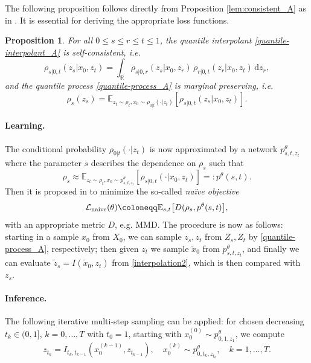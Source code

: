 \documentclass{article}
\newcommand{\R}{\mathbb{R}}
\renewcommand{\d}{\, \mathrm{d}}
\theoremstyle{plain}
\newtheorem{proposition}[theorem]{Proposition}
\theoremstyle{definition}
\theoremstyle{remark}
\begin{document}
The following proposition follows directly 
from Proposition \ref{lem:consistent_A} as in \cite{IMM2025}. It is essential for deriving the appropriate loss functions.

\begin{proposition}\label{lem:self-consistency_A}
For all $0 \le s \le r \le t\le 1$, the quantile interpolant \eqref{quantile-interpolant_A} is self-consistent, i.e.
\begin{equation}
\rho_{s|0, t}(z_s|x_0, z_t)
= \int_{\R} \rho_{s|0, r}(z_s|x_0, z_r) \, \rho_{r|0, t}(z_r|x_0, z_t) \d z_r , 
\end{equation}
and the quantile process \eqref{quantile-process_A} is marginal preserving, i.e.
    \begin{equation}\label{eq:marginal-preserv}
        \rho_{s}(z_s) 
        = 
        \mathbb E_{z_t \sim \rho_{t}, x_0 \sim \rho_{0|t}(\cdot|z_t)}
        \left[ \rho_{s|0, t}(z_s|x_0, z_t) \right].
    \end{equation}    
\end{proposition}

\paragraph{Learning.} The conditional probability  $\rho_{0|t}(\cdot|z_t)$ is now approximated by a network $p^\theta_{s,t,z_t}$ where the parameter $s$ describes the dependence on $\rho_{s}$ such that
\begin{equation}\label{target-objective}
  \rho_{s}  \approx  
        \mathbb E_{z_t \sim \rho_{t}, x_0 \sim p^\theta_{s,t,z_t}}
        \left[ \rho_{s|0, t}(\cdot|x_0, z_t) \right] =: p^\theta(s,t).
        \end{equation}  
Then it is proposed in \cite{IMM2025} to minimize the so-called \emph{na\"ive objective}
\begin{equation}\label{naive-objective}
   \mathcal{L}_{\rm naive}(\theta) \coloneqq \mathbb{E}_{s,t} \big[ D(\rho_{s}, p^\theta(s,t) \big],
\end{equation}
with an appropriate metric $D$, e.g. MMD. 
The procedure is now as follows: starting in a sample $x_0$ from $X_0$, we can sample $z_s, z_t$ from $Z_s, Z_t$ by \eqref{quantile-process_A}, respectively; then given $z_t$ we sample $\tilde x_0$ from $p^\theta_{s,t,z_t}$, and finally we can evaluate $\tilde z_s=I(\tilde x_0,z_t)$ from \eqref{interpolation2}, which is then compared with $z_s$.
\paragraph{Inference.} The following iterative 
multi-step sampling can be applied: for chosen decreasing 
$t_k \in (0,1]$, $k=0,\ldots,T$ with $t_0 = 1$,
starting with 
$x_0^{(0)} \sim p_{0,1,z_1}^\theta$, we compute
$$z_{t_k} = I_{t_k, t_{k-1}}\left(x_0^{(k-1)},z_{t_{k-1}} \right), 
\quad 
x_0^{(k)} \sim p_{0,t_k,z_{t_k}}^\theta, \quad k=1,\ldots,T.$$
\end{document}
